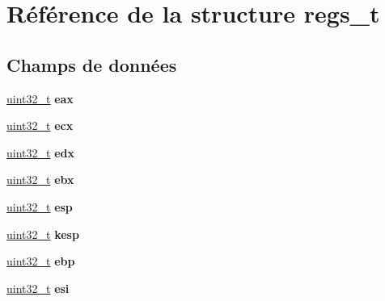 \hypertarget{structregs__t}{\section{Référence de la structure regs\-\_\-t}
\label{structregs__t}
}
\subsection*{Champs de données}
\begin{DoxyCompactItemize}
\item 
\hypertarget{structregs__t_aa9a75f4eda54de076eda1660651b769f}{\hyperlink{types_8h_a33594304e786b158f3fb30289278f5af}{uint32\-\_\-t} {\bfseries eax}}\label{structregs__t_aa9a75f4eda54de076eda1660651b769f}

\item 
\hypertarget{structregs__t_a676d960cd440fd0f20db7eb63a1c19d3}{\hyperlink{types_8h_a33594304e786b158f3fb30289278f5af}{uint32\-\_\-t} {\bfseries ecx}}\label{structregs__t_a676d960cd440fd0f20db7eb63a1c19d3}

\item 
\hypertarget{structregs__t_a4a66fee02bbade605198a3b50bb1fdb5}{\hyperlink{types_8h_a33594304e786b158f3fb30289278f5af}{uint32\-\_\-t} {\bfseries edx}}\label{structregs__t_a4a66fee02bbade605198a3b50bb1fdb5}

\item 
\hypertarget{structregs__t_a61356855d8ea23d8dbff17de7c25aae4}{\hyperlink{types_8h_a33594304e786b158f3fb30289278f5af}{uint32\-\_\-t} {\bfseries ebx}}\label{structregs__t_a61356855d8ea23d8dbff17de7c25aae4}

\item 
\hypertarget{structregs__t_ad8c205a88fa796d24c4bb6f38cc61c19}{\hyperlink{types_8h_a33594304e786b158f3fb30289278f5af}{uint32\-\_\-t} {\bfseries esp}}\label{structregs__t_ad8c205a88fa796d24c4bb6f38cc61c19}

\item 
\hypertarget{structregs__t_a39ba25914a655f8ef14c82f1b5a3d052}{\hyperlink{types_8h_a33594304e786b158f3fb30289278f5af}{uint32\-\_\-t} {\bfseries kesp}}\label{structregs__t_a39ba25914a655f8ef14c82f1b5a3d052}

\item 
\hypertarget{structregs__t_a29681e15e92ec0a53c03b64599ba40b4}{\hyperlink{types_8h_a33594304e786b158f3fb30289278f5af}{uint32\-\_\-t} {\bfseries ebp}}\label{structregs__t_a29681e15e92ec0a53c03b64599ba40b4}

\item 
\hypertarget{structregs__t_a87d05b726eb88347c61c93c05d7e5f20}{\hyperlink{types_8h_a33594304e786b158f3fb30289278f5af}{uint32\-\_\-t} {\bfseries esi}}\label{structregs__t_a87d05b726eb88347c61c93c05d7e5f20}


\end{DoxyCompactItemize}

